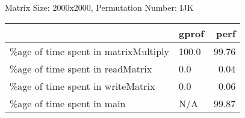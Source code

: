 \documentclass{article}
\begin{document}
    Matrix Size: 2000x2000, Permutation Number: IJK \\
    \begin{tabular}{llr}
\hline
                                      & gprof   &   perf \\
\hline
 \%age of time spent in matrixMultiply & 100.0   &  99.76 \\
 \%age of time spent in readMatrix     & 0.0     &   0.04 \\
 \%age of time spent in writeMatrix    & 0.0     &   0.06 \\
 \%age of time spent in main           & N/A     &  99.87 \\
\hline
\end{tabular}
    
\end{document}
